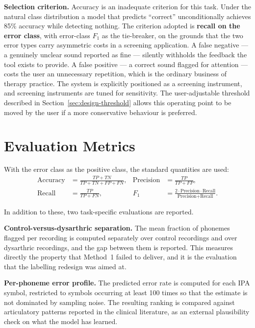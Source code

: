 \textbf{Selection criterion.} Accuracy is an inadequate criterion for this
task. Under the natural class distribution a model that predicts ``correct''
unconditionally achieves 85\% accuracy while detecting nothing. The criterion
adopted is \textbf{recall on the error class}, with error-class $F_1$ as the
tie-breaker, on the grounds that the two error types carry asymmetric costs in
a screening application. A false negative --- a genuinely unclear sound reported
as fine --- silently withholds the feedback the tool exists to provide. A false
positive --- a correct sound flagged for attention --- costs the user an
unnecessary repetition, which is the ordinary business of therapy practice. The
system is explicitly positioned as a screening instrument, and screening
instruments are tuned for sensitivity. The user-adjustable threshold described
in Section~\ref{sec:design-threshold} allows this operating point to be moved
by the user if a more conservative behaviour is preferred.

\section{Evaluation Metrics}
\label{sec:metrics}

With the error class as the positive class, the standard quantities are used:
\begin{align}
\text{Accuracy}  &= \frac{TP + TN}{TP + TN + FP + FN}, &
\text{Precision} &= \frac{TP}{TP + FP}, \label{eq:acc-prec}\\[4pt]
\text{Recall}    &= \frac{TP}{TP + FN}, &
F_1              &= \frac{2 \cdot \text{Precision} \cdot \text{Recall}}
                          {\text{Precision} + \text{Recall}}. \label{eq:rec-f1}
\end{align}

In addition to these, two task-specific evaluations are reported.

\textbf{Control-versus-dysarthric separation.} The mean fraction of phonemes
flagged per recording is computed separately over control recordings and over
dysarthric recordings, and the gap between them is reported. This measures
directly the property that Method~1 failed to deliver, and it is the evaluation
that the labelling redesign was aimed at.

\textbf{Per-phoneme error profile.} The predicted error rate is computed for
each IPA symbol, restricted to symbols occurring at least 100 times so that the
estimate is not dominated by sampling noise. The resulting ranking is compared
against articulatory patterns reported in the clinical literature, as an
external plausibility check on what the model has learned.

